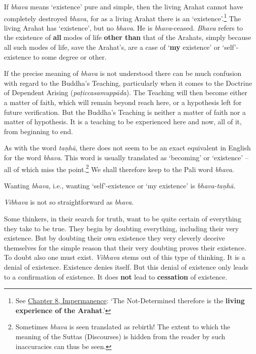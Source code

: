 If \emph{bhava} means `existence' pure and simple, then the living Arahat cannot have completely destroyed \emph{bhava}, for as a living Arahat there is an `existence'.\footnote{See \href{ch-08-impermanence.xml\#living-experience}{Chapter 8, Impermanence}: `The Not-Determined therefore is the \textbf{living experience of the Arahat}.'} The living Arahat has `existence', but no \emph{bhava}. He is \emph{bhava}-ceased. \emph{Bhava} refers to the existence of \textbf{all} modes of life \textbf{other than} that of the Arahats, simply because all such modes of life, save the Arahat's, are a case of `\textbf{my} existence' or `self'-existence to some degree or other.

If the precise meaning of \emph{bhava} is not understood there can be much confusion with regard to the Buddha's Teaching, particularly when it comes to the Doctrine of Dependent Arising (\emph{paṭiccasamuppāda}). The Teaching will then become either a matter of faith, which will remain beyond reach here, or a hypothesis left for future verification. But the Buddha's Teaching is neither a matter of faith nor a matter of hypothesis. It is a teaching to be experienced here and now, all of it, from beginning to end.

As with the word \emph{taṇhā}, there does not seem to be an exact equivalent in English for the word \emph{bhava}. This word is usually translated as `becoming' or `existence' -- all of which miss the point.\footnote{Sometimes \emph{bhava} is seen translated as rebirth! The extent to which the meaning of the Suttas (Discourses) is hidden from the reader by such inaccuracies can thus be seen.} We shall therefore keep to the Pali word \emph{bhava}.

Wanting \emph{bhava}, i.e., wanting `self'-existence or `my existence' is \emph{bhava-taṇhā}.

\emph{Vibhava} is not so straightforward as \emph{bhava}.

Some thinkers, in their search for truth, want to be quite certain of everything they take to be true. They begin by doubting everything, including their very existence. But by doubting their own existence they very cleverly deceive themselves for the simple reason that their very doubting proves their existence. To doubt also one must exist. \emph{Vibhava} stems out of this type of thinking. It is a denial of existence. Existence denies itself. But this denial of existence only leads to a confirmation of existence. It does \textbf{not} lead to \textbf{cessation} of existence.

